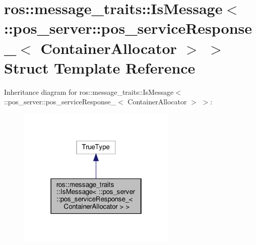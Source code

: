 \hypertarget{structros_1_1message__traits_1_1IsMessage_3_01_1_1pos__server_1_1pos__serviceResponse___3_01ContainerAllocator_01_4_01_4}{}\section{ros\+:\+:message\+\_\+traits\+:\+:Is\+Message$<$ \+:\+:pos\+\_\+server\+:\+:pos\+\_\+service\+Response\+\_\+$<$ Container\+Allocator $>$ $>$ Struct Template Reference}
\label{structros_1_1message__traits_1_1IsMessage_3_01_1_1pos__server_1_1pos__serviceResponse___3_01ContainerAllocator_01_4_01_4}


Inheritance diagram for ros\+:\+:message\+\_\+traits\+:\+:Is\+Message$<$ \+:\+:pos\+\_\+server\+:\+:pos\+\_\+service\+Response\+\_\+$<$ Container\+Allocator $>$ $>$\+:
\nopagebreak
\begin{figure}[H]
\begin{center}
\leavevmode
\includegraphics[width=214pt]{structros_1_1message__traits_1_1IsMessage_3_01_1_1pos__server_1_1pos__serviceResponse___3_01Contf0ffbfe3730235ca520bd2f86aaaf0ff}
\end{center}
\end{figure}


